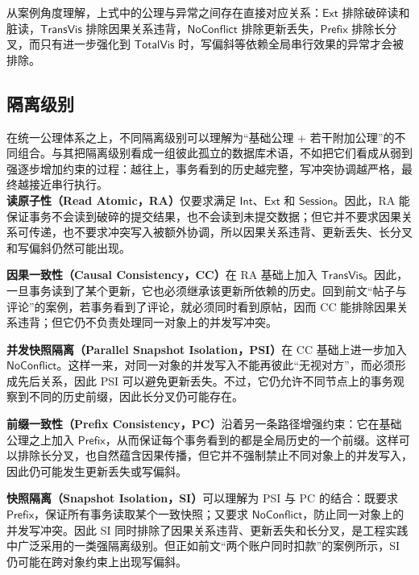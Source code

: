 从案例角度理解，上式中的公理与异常之间存在直接对应关系：$\mathsf{Ext}$ 排除破碎读和脏读，$\mathsf{TransVis}$ 排除因果关系违背，$\mathsf{NoConflict}$ 排除更新丢失，$\mathsf{Prefix}$ 排除长分叉，而只有进一步强化到 $\mathsf{TotalVis}$ 时，写偏斜等依赖全局串行效果的异常才会被排除。

\subsection{隔离级别}
在统一公理体系之上，不同隔离级别可以理解为“基础公理 + 若干附加公理”的不同组合。与其把隔离级别看成一组彼此孤立的数据库术语，不如把它们看成从弱到强逐步增加约束的过程：越往上，事务看到的历史越完整，写冲突协调越严格，最终越接近串行执行。
\\

\noindent\textbf{读原子性（Read Atomic，RA）}\cite{bailis2016ramp}仅要求满足 $\mathsf{Int}$、$\mathsf{Ext}$ 和 $\mathsf{Session}$。因此，RA 能保证事务不会读到破碎的提交结果，也不会读到未提交数据；但它并不要求因果关系可传递，也不要求冲突写入被额外协调，所以因果关系违背、更新丢失、长分叉和写偏斜仍然可能出现。

\noindent\textbf{因果一致性（Causal Consistency，CC）}\cite{akkoorath2016cure}在 RA 基础上加入 $\mathsf{TransVis}$。因此，一旦事务读到了某个更新，它也必须继承该更新所依赖的历史。回到前文“帖子与评论”的案例，若事务看到了评论，就必须同时看到原帖，因而 CC 能排除因果关系违背；但它仍不负责处理同一对象上的并发写冲突。

\noindent\textbf{并发快照隔离（Parallel Snapshot Isolation，PSI）}\cite{sovran2011walter}在 CC 基础上进一步加入 $\mathsf{NoConflict}$。这样一来，对同一对象的并发写入不能再彼此“无视对方”，而必须形成先后关系，因此 PSI 可以避免更新丢失。不过，它仍允许不同节点上的事务观察到不同的历史前缀，因此长分叉仍可能存在。

\noindent\textbf{前缀一致性（Prefix Consistency，PC）}\cite{burckhardt2015global}沿着另一条路径增强约束：它在基础公理之上加入 $\mathsf{Prefix}$，从而保证每个事务看到的都是全局历史的一个前缀。这样可以排除长分叉，也自然蕴含因果传播，但它并不强制禁止不同对象上的并发写入，因此仍可能发生更新丢失或写偏斜。

\noindent\textbf{快照隔离（Snapshot Isolation，SI）}\cite{berenson1995critique}可以理解为 PSI 与 PC 的结合：既要求 $\mathsf{Prefix}$，保证所有事务读取某个一致快照；又要求 $\mathsf{NoConflict}$，防止同一对象上的并发写冲突。因此 SI 同时排除了因果关系违背、更新丢失和长分叉，是工程实践中广泛采用的一类强隔离级别。但正如前文“两个账户同时扣款”的案例所示，SI 仍可能在跨对象约束上出现写偏斜。

